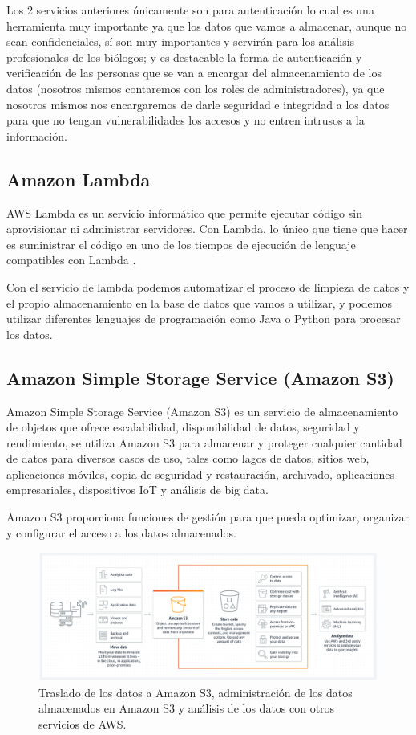 Los 2 servicios anteriores únicamente son para autenticación lo cual es una herramienta muy importante ya que los datos que vamos a almacenar, aunque no sean confidenciales, sí son muy importantes y servirán para los análisis profesionales de los biólogos; y es destacable la forma de autenticación y verificación de las personas que se van a encargar del almacenamiento de los datos (nosotros mismos contaremos con los roles de administradores), ya que nosotros mismos nos encargaremos de darle seguridad e integridad a los datos para que no tengan vulnerabilidades los accesos y no entren intrusos a la información.

\subsection{Amazon Lambda}

AWS Lambda es un servicio informático que permite ejecutar código sin aprovisionar ni administrar servidores. Con Lambda, lo único que tiene que hacer es suministrar el código en uno de los tiempos de ejecución de lenguaje compatibles con Lambda \cite{131}.

Con el servicio de lambda podemos automatizar el proceso de limpieza de datos y el propio almacenamiento en la base de datos que vamos a utilizar, y podemos utilizar diferentes lenguajes de programación como Java o Python para procesar los datos.

\subsection{Amazon Simple Storage Service (Amazon S3)}

Amazon Simple Storage Service (Amazon S3) es un servicio de almacenamiento de objetos que ofrece escalabilidad, disponibilidad de datos, seguridad y rendimiento, se utiliza Amazon S3 para almacenar y proteger cualquier cantidad de datos para diversos casos de uso, tales como lagos de datos, sitios web, aplicaciones móviles, copia de seguridad y restauración, archivado, aplicaciones empresariales, dispositivos IoT y análisis de big data.

Amazon S3 proporciona funciones de gestión para que pueda optimizar, organizar y configurar el acceso a los datos almacenados.



\begin{figure}[hbtp]
\centering
\includegraphics[width=\textwidth]{imagenes/s3.png}
\caption{Traslado de los datos a Amazon S3, administración de los datos almacenados en Amazon S3 y análisis de los datos con otros servicios de AWS. }
\end{figure}

